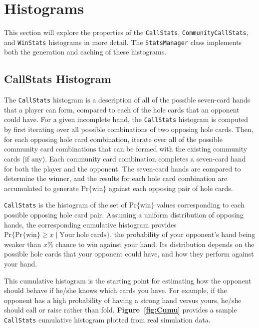 \section{Histograms}
\label{sec:Histograms}

This section will explore the properties of the \texttt{CallStats}, \texttt{CommunityCallStats}, and \texttt{WinStats} histograms in more detail.
The \texttt{StatsManager} class implements both the generation and caching of these histograms.

\subsection{CallStats Histogram}
\label{sec:CallStats}

The \texttt{CallStats} histogram is a description of all of the possible seven-card hands that a player can form, compared to each of the hole cards that an opponent could have.
For a given incomplete hand, the \texttt{CallStats} histogram is computed by first iterating over all possible combinations of two opposing hole cards.
Then, for each opposing hole card combination, iterate over all of the possible community card combinations that can be formed with the existing community cards (if any).
Each community card combination completes a seven-card hand for both the player and the opponent.
The seven-card hands are compared to determine the winner, and the results for each hole card combination are accumulated to generate $\mathrm{Pr\{win\}}$ against each opposing pair of hole cards.

\texttt{CallStats} is the histogram of the set of $\mathrm{Pr\{win\}}$ values corresponding to each possible opposing hole card pair.
Assuming a uniform distribution of opposing hands, the corresponding cumulative histogram provides $\mathrm{Pr}\{\mathrm{Pr\{win\}} \ge x \; | \; \mathrm{Your\:hole\:cards}\}$, the probability of your opponent's hand being weaker than $x$\% chance to win against your hand.
Its distribution depends on the possible hole cards that your opponent could have, and how they perform against your hand.

This cumulative histogram is the starting point for estimating how the opponent should behave if he/she knows which cards you have.
For example, if the opponent has a high probability of having a strong hand versus yours, he/she should call or raise rather than fold.
\textbf{Figure~\ref{fig:Cumu}} provides a sample \texttt{CallStats} cumulative histogram plotted from real simulation data.

